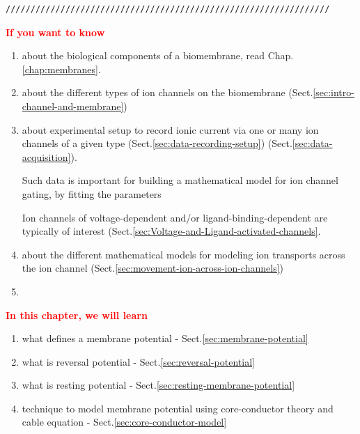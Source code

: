  
\begin{verbatim}
/////////////////////////////////////////////////////////////////
\end{verbatim}
\textcolor{red}{\bf If you want to know} 
\begin{enumerate}
  \item about the biological components of a biomembrane,
  read Chap.\ref{chap:membranes}.

  \item about the different types of ion channels on the
  biomembrane (Sect.\ref{sec:intro-channel-and-membrane}) 
  
  \item about experimental setup to record ionic current via one or many
  ion channels of a given type
  (Sect.\ref{sec:data-recording-setup}) 
  (Sect.\ref{sec:data-acquisition}).
  
  Such data is important for building a mathematical model for ion channel
  gating, by fitting the parameters
  
  Ion channels of voltage-dependent and/or ligand-binding-dependent are
  typically of interest (Sect.\ref{sec:Voltage-and-Ligand-activated-channels}. 
  
  \item about the different mathematical models for modeling ion transports
  across the ion channel (Sect.\ref{sec:movement-ion-across-ion-channels})

  \item 
\end{enumerate}

\textcolor{red}{\bf In this chapter, we will learn} 
\begin{enumerate}  
  \item what defines a membrane potential - Sect.\ref{sec:membrane-potential}    

  \item what is reversal potential - Sect.\ref{sec:reversal-potential}
  
  \item what is resting potential - Sect.\ref{sec:resting-membrane-potential}
  
  \item technique to model membrane potential using core-conductor theory and
  cable equation - Sect.\ref{sec:core-conductor-model}
\end{enumerate}




